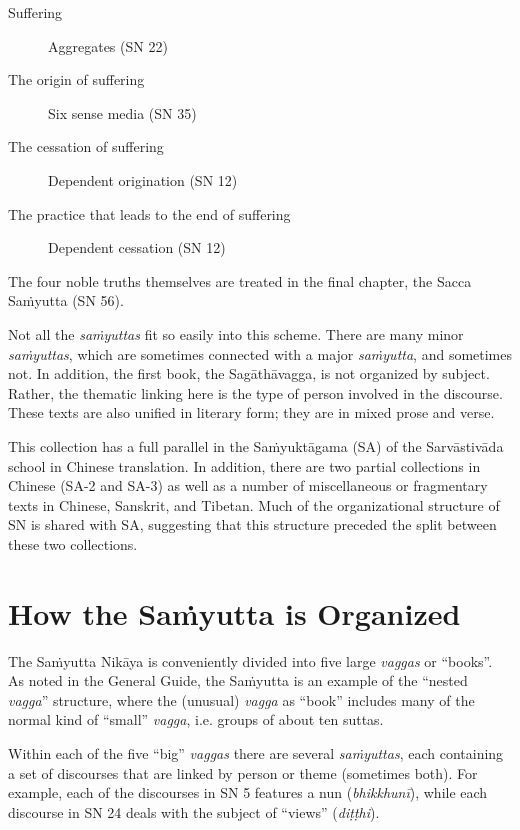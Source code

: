 \documentclass[12pt,openany]{book}%
\begin{document}
\begin{description}%
\item[Suffering] Aggregates (SN 22)%
\item[The origin of suffering] Six sense media (SN 35)%
\item[The cessation of suffering] Dependent origination (SN 12)%
\item[The practice that leads to the end of suffering] Dependent cessation (SN 12)%
\end{description}

The four noble truths themselves are treated in the final chapter, the Sacca \textsanskrit{Saṁyutta} (SN 56).

Not all the \textit{\textsanskrit{saṁyuttas}} fit so easily into this scheme. There are many minor \textit{\textsanskrit{saṁyuttas}}, which are sometimes connected with a major \textit{\textsanskrit{saṁyutta}}, and sometimes not. In addition, the first book, the \textsanskrit{Sagāthāvagga}, is not organized by subject. Rather, the thematic linking here is the type of person involved in the discourse. These texts are also unified in literary form; they are in mixed prose and verse.

This collection has a full parallel in the \textsanskrit{Saṁyuktāgama} (SA) of the \textsanskrit{Sarvāstivāda} school in Chinese translation. In addition, there are two partial collections in Chinese (SA-2 and SA-3) as well as a number of miscellaneous or fragmentary texts in Chinese, Sanskrit, and Tibetan. Much of the organizational structure of SN is shared with SA, suggesting that this structure preceded the split between these two collections.

\section*{How the \textsanskrit{Saṁyutta} is Organized}

The \textsanskrit{Saṁyutta} \textsanskrit{Nikāya} is conveniently divided into five large \textit{vaggas} or “books”. As noted in the General Guide, the \textsanskrit{Saṁyutta} is an example of the “nested \textit{vagga}” structure, where the (unusual) \textit{vagga} as “book” includes many of the normal kind of “small” \textit{vagga}, i.e. groups of about ten suttas.

Within each of the five “big” \textit{vaggas} there are several \textit{\textsanskrit{saṁyuttas}}, each containing a set of discourses that are linked by person or theme (sometimes both). For example, each of the discourses in SN 5 features a nun (\textit{\textsanskrit{bhikkhunī}}), while each discourse in SN 24 deals with the subject of “views” (\textit{\textsanskrit{diṭṭhi}}).
\end{document}
